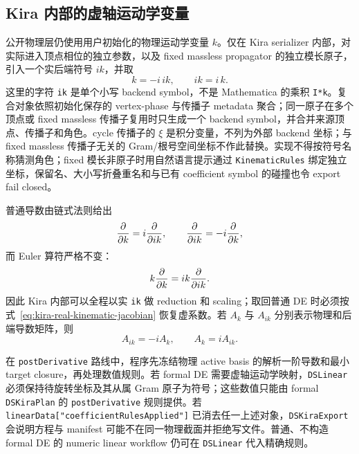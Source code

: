 ﻿\documentclass[a4paper,11pt]{article}
\begin{document}
\subsection{Kira 内部的虚轴运动学变量}

公开物理层仍使用用户初始化的物理运动学变量 $k$。仅在 Kira serializer 内部，对实际进入顶点相位的独立参数，以及 fixed massless propagator 的独立模长原子，引入一个实后端符号 $ik$，并取
\begin{equation}
 k=-i\,ik,\qquad ik=i\,k.
 \label{eq:kira-real-kinematic-map}
\end{equation}
这里的字符 \texttt{ik} 是单个小写 backend symbol，不是 Mathematica 的乘积 \texttt{I*k}。复合对象依照初始化保存的 vertex-phase 与传播子 metadata 聚合；同一原子在多个顶点或 fixed massless 传播子复用时只生成一个 backend symbol，并合并来源顶点、传播子和角色。cycle 传播子的 $\xi$ 是积分变量，不列为外部 backend 坐标；与 fixed massless 传播子无关的 Gram/根号空间坐标不作此替换。实现不得按符号名称猜测角色；fixed 模长非原子时用自然语言提示通过 \texttt{KinematicRules} 绑定独立坐标，保留名、大小写折叠重名和与已有 coefficient symbol 的碰撞也令 export fail closed。

普通导数由链式法则给出
\begin{equation}
 {\partial\over\partial k}=i{\partial\over\partial ik},
 \qquad
 {\partial\over\partial ik}=-i{\partial\over\partial k},
 \label{eq:kira-real-kinematic-jacobian}
\end{equation}
而 Euler 算符严格不变：
\begin{equation}
 k{\partial\over\partial k}=ik{\partial\over\partial ik}.
 \label{eq:kira-real-kinematic-euler}
\end{equation}
因此 Kira 内部可以全程以实 \texttt{ik} 做 reduction 和 scaling；取回普通 DE 时必须按式~\eqref{eq:kira-real-kinematic-jacobian} 恢复虚系数。若 $A_k$ 与 $A_{ik}$ 分别表示物理和后端导数矩阵，则
\begin{equation}
 A_{ik}=-iA_k,\qquad A_k=iA_{ik}.
\end{equation}

在 \texttt{postDerivative} 路线中，程序先冻结物理 active basis 的解析一阶导数和最小 target closure，再处理数值规则。若 formal DE 需要虚轴运动学映射，\texttt{DSLinear} 必须保持待旋转坐标及其从属 Gram 原子为符号；这些数值只能由 formal \texttt{DSKiraPlan} 的 \texttt{postDerivative} 规则提供。若 \texttt{linearData["coefficientRulesApplied"]} 已消去任一上述对象，\texttt{DSKiraExport} 会说明方程与 manifest 可能不在同一物理截面并拒绝写文件。普通、不构造 formal DE 的 numeric linear workflow 仍可在 \texttt{DSLinear} 代入精确规则。
\end{document}
